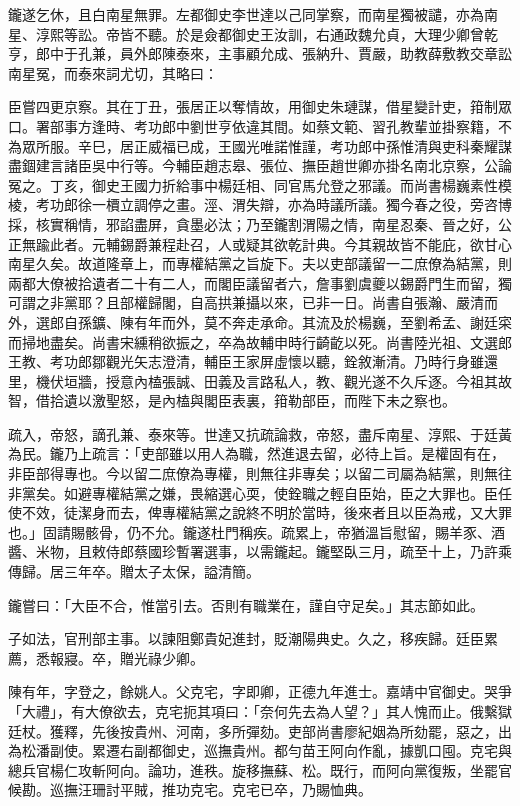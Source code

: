 \begin{pinyinscope}
鑨遂乞休，且白南星無罪。左都御史李世達以己同掌察，而南星獨被譴，亦為南星、淳熙等訟。帝皆不聽。於是僉都御史王汝訓，右通政魏允貞，大理少卿曾乾亨，郎中于孔兼，員外郎陳泰來，主事顧允成、張納升、賈嚴，助教薛敷教交章訟南星冤，而泰來詞尤切，其略曰：

臣嘗四更京察。其在丁丑，張居正以奪情故，用御史朱璉謀，借星變計吏，箝制眾口。署部事方逢時、考功郎中劉世亨依違其間。如蔡文範、習孔教輩並掛察籍，不為眾所服。辛巳，居正威福已成，王國光唯諾惟謹，考功郎中孫惟清與吏科秦耀謀盡錮建言諸臣吳中行等。今輔臣趙志皋、張位、撫臣趙世卿亦掛名南北京察，公論冤之。丁亥，御史王國力折給事中楊廷相、同官馬允登之邪議。而尚書楊巍素性模棱，考功郎徐一檟立調停之畫。涇、渭失辯，亦為時議所議。獨今春之役，旁咨博採，核實稱情，邪諂盡屏，貪墨必汰；乃至鑨割渭陽之情，南星忍秦、晉之好，公正無踰此者。元輔錫爵兼程赴召，人或疑其欲乾計典。今其親故皆不能庇，欲甘心南星久矣。故道隆章上，而專權結黨之旨旋下。夫以吏部議留一二庶僚為結黨，則兩都大僚被拾遺者二十有二人，而閣臣議留者六，詹事劉虞夔以錫爵門生而留，獨可謂之非黨耶？且部權歸閣，自高拱兼攝以來，已非一日。尚書自張瀚、嚴清而外，選郎自孫鑛、陳有年而外，莫不奔走承命。其流及於楊巍，至劉希孟、謝廷寀而掃地盡矣。尚書宋纁稍欲振之，卒為故輔申時行齮齕以死。尚書陸光祖、文選郎王教、考功郎鄒觀光矢志澄清，輔臣王家屏虛懷以聽，銓敘漸清。乃時行身雖還里，機伏垣牆，授意內榼張誠、田義及言路私人，教、觀光遂不久斥逐。今祖其故智，借拾遺以激聖怒，是內榼與閣臣表裏，箝勒部臣，而陛下未之察也。

疏入，帝怒，謫孔兼、泰來等。世達又抗疏論救，帝怒，盡斥南星、淳熙、于廷黃為民。鑨乃上疏言：「吏部雖以用人為職，然進退去留，必待上旨。是權固有在，非臣部得專也。今以留二庶僚為專權，則無往非專矣；以留二司屬為結黨，則無往非黨矣。如避專權結黨之嫌，畏縮選心耎，使銓職之輕自臣始，臣之大罪也。臣任使不效，徒潔身而去，俾專權結黨之說終不明於當時，後來者且以臣為戒，又大罪也。」固請賜骸骨，仍不允。鑨遂杜門稱疾。疏累上，帝猶溫旨慰留，賜羊豕、酒醬、米物，且敕侍郎蔡國珍暫署選事，以需鑨起。鑨堅臥三月，疏至十上，乃許乘傳歸。居三年卒。贈太子太保，謚清簡。

鑨嘗曰：「大臣不合，惟當引去。否則有職業在，謹自守足矣。」其志節如此。

子如法，官刑部主事。以諫阻鄭貴妃進封，貶潮陽典史。久之，移疾歸。廷臣累薦，悉報寢。卒，贈光祿少卿。

陳有年，字登之，餘姚人。父克宅，字即卿，正德九年進士。嘉靖中官御史。哭爭「大禮」，有大僚欲去，克宅扼其項曰：「奈何先去為人望？」其人愧而止。俄繫獄廷杖。獲釋，先後按貴州、河南，多所彈劾。吏部尚書廖紀姻為所劾罷，惡之，出為松潘副使。累遷右副都御史，巡撫貴州。都勻苗王阿向作亂，據凱口囤。克宅與總兵官楊仁攻斬阿向。論功，進秩。旋移撫蘇、松。既行，而阿向黨復叛，坐罷官候勘。巡撫汪珊討平賊，推功克宅。克宅已卒，乃賜恤典。


\end{pinyinscope}
